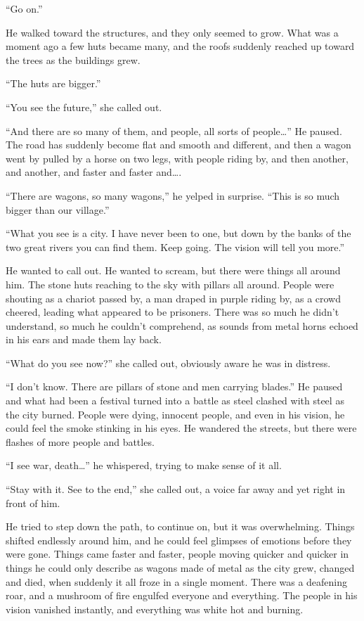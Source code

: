 ``Go on.''

He walked toward the structures, and they only seemed to grow. What was a moment ago a few huts became many, and the roofs suddenly reached up toward the trees as the buildings grew.

``The huts are bigger.''

``You see the future,'' she called out.

``And there are so many of them, and people, all sorts of people\ldots'' He paused. The road has suddenly become flat and smooth and different, and then a wagon went by pulled by a horse on two legs, with people riding by, and then another, and another, and faster and faster and\ldots.

``There are wagons, so many wagons,'' he yelped in surprise. ``This is so much bigger than our village.''

``What you see is a city. I have never been to one, but down by the banks of the two great rivers you can find them. Keep going. The vision will tell you more.''

He wanted to call out. He wanted to scream, but there were things all around him. The stone huts reaching to the sky with pillars all around. People were shouting as a chariot passed by, a man draped in purple riding by, as a crowd cheered, leading what appeared to be prisoners. There was so much he didn't understand, so much he couldn't comprehend, as sounds from metal horns echoed in his ears and made them lay back.

``What do you see now?'' she called out, obviously aware he was in distress.

``I don't know. There are pillars of stone and men carrying blades.'' He paused and what had been a festival turned into a battle as steel clashed with steel as the city burned. People were dying, innocent people, and even in his vision, he could feel the smoke stinking in his eyes. He wandered the streets, but there were flashes of more people and battles.

``I see war, death\ldots'' he whispered, trying to make sense of it all.

``Stay with it. See to the end,'' she called out, a voice far away and yet right in front of him.

He tried to step down the path, to continue on, but it was overwhelming. Things shifted endlessly around him, and he could feel glimpses of emotions before they were gone. Things came faster and faster, people moving quicker and quicker in things he could only describe as wagons made of metal as the city grew, changed and died, when suddenly it all froze in a single moment. There was a deafening roar, and a mushroom of fire engulfed everyone and everything. The people in his vision vanished instantly, and everything was white hot and burning.

